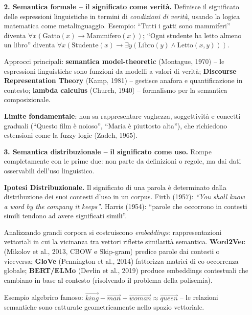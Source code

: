 \documentclass[12pt,a4paper]{article}
\begin{document}
\textbf{2. Semantica formale -- il significato come verit\`a.} Definisce il significato delle espressioni linguistiche in termini di \emph{condizioni di verit\`a}, usando la logica matematica come metalinguaggio. Esempio: ``Tutti i gatti sono mammiferi'' diventa $\forall x(\text{Gatto}(x) \to \text{Mammifero}(x))$; ``Ogni studente ha letto almeno un libro'' diventa $\forall x(\text{Studente}(x) \to \exists y(\text{Libro}(y) \land \text{Letto}(x,y)))$.

Approcci principali: \textbf{semantica model-theoretic} (Montague, 1970) -- le espressioni linguistiche sono funzioni da modelli a valori di verit\`a; \textbf{Discourse Representation Theory} (Kamp, 1981) -- gestisce anafora e quantificazione in contesto; \textbf{lambda calculus} (Church, 1940) -- formalismo per la semantica composizionale.

\textbf{Limite fondamentale}: non sa rappresentare vaghezza, soggettivit\`a e concetti graduali (``Questo film \`e noioso'', ``Maria \`e piuttosto alta''), che richiedono estensioni come la fuzzy logic (Zadeh, 1965).

\textbf{3. Semantica distribuzionale -- il significato come uso.} Rompe completamente con le prime due: non parte da definizioni o regole, ma dai dati osservabili dell'uso linguistico.

\begin{defbox}
\textbf{Ipotesi Distribuzionale.}
Il significato di una parola \`e determinato dalla distribuzione dei suoi contesti d'uso in un corpus. Firth (1957): \emph{``You shall know a word by the company it keeps''}. Harris (1954): ``parole che occorrono in contesti simili tendono ad avere significati simili''.
\end{defbox}

Analizzando grandi corpora si costruiscono \emph{embeddings}: rappresentazioni vettoriali in cui la vicinanza tra vettori riflette similarit\`a semantica. \textbf{Word2Vec} (Mikolov et al., 2013, CBOW e Skip-gram) predice parole dai contesti o viceversa; \textbf{GloVe} (Pennington et al., 2014) fattorizza matrici di co-occorrenza globale; \textbf{BERT/ELMo} (Devlin et al., 2019) produce embeddings contestuali che cambiano in base al contesto (risolvendo il problema della polisemia).

\begin{examplebox}
Esempio algebrico famoso: $\vec{king} - \vec{man} + \vec{woman} \approx \vec{queen}$ -- le relazioni semantiche sono catturate geometricamente nello spazio vettoriale.
\end{examplebox}
\end{document}
